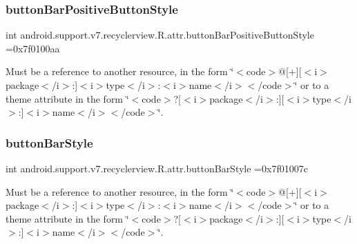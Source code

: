 \subsubsection{\texorpdfstring{button\+Bar\+Positive\+Button\+Style}{buttonBarPositiveButtonStyle}}
{\footnotesize\ttfamily int android.\+support.\+v7.\+recyclerview.\+R.\+attr.\+button\+Bar\+Positive\+Button\+Style =0x7f0100aa\hspace{0.3cm}{\ttfamily [static]}}

Must be a reference to another resource, in the form \char`\"{}$<$code$>$@\mbox{[}+\mbox{]}\mbox{[}$<$i$>$package$<$/i$>$\+:\mbox{]}$<$i$>$type$<$/i$>$\+:$<$i$>$name$<$/i$>$$<$/code$>$\char`\"{} or to a theme attribute in the form \char`\"{}$<$code$>$?\mbox{[}$<$i$>$package$<$/i$>$\+:\mbox{]}\mbox{[}$<$i$>$type$<$/i$>$\+:\mbox{]}$<$i$>$name$<$/i$>$$<$/code$>$\char`\"{}. \mbox{\label{classandroid_1_1support_1_1v7_1_1recyclerview_1_1R_1_1attr_aaba51635973cdb3f3495cc3ba1a79f6c}} 
\subsubsection{\texorpdfstring{button\+Bar\+Style}{buttonBarStyle}}
{\footnotesize\ttfamily int android.\+support.\+v7.\+recyclerview.\+R.\+attr.\+button\+Bar\+Style =0x7f01007c\hspace{0.3cm}{\ttfamily [static]}}

Must be a reference to another resource, in the form \char`\"{}$<$code$>$@\mbox{[}+\mbox{]}\mbox{[}$<$i$>$package$<$/i$>$\+:\mbox{]}$<$i$>$type$<$/i$>$\+:$<$i$>$name$<$/i$>$$<$/code$>$\char`\"{} or to a theme attribute in the form \char`\"{}$<$code$>$?\mbox{[}$<$i$>$package$<$/i$>$\+:\mbox{]}\mbox{[}$<$i$>$type$<$/i$>$\+:\mbox{]}$<$i$>$name$<$/i$>$$<$/code$>$\char`\"{}. \mbox{\label{classandroid_1_1support_1_1v7_1_1recyclerview_1_1R_1_1attr_ad5d2a4ac315975a2cbbd53dfdf90bc62}} 
